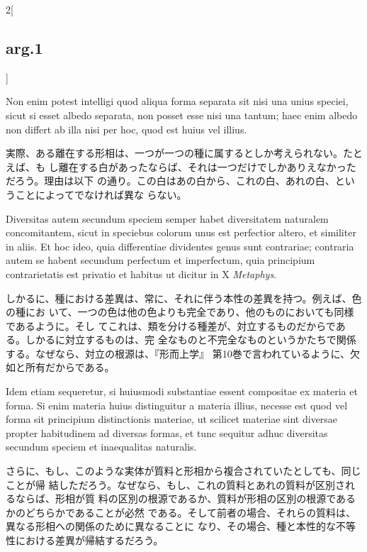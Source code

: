 \documentclass[paper=a4paper,fontsize=10pt,jafontsize=9pt,titlepage]{jlreq}
\begin{document}
\begin{paracol}{2}[\subsection{arg.1}]
\switchcolumn*

Non enim potest intelligi quod aliqua forma separata sit nisi una
unius speciei, sicut si esset albedo separata, non posset esse nisi
una tantum; haec enim albedo non differt ab illa nisi per hoc, quod
est huius vel illius.

\switchcolumn

実際、ある離在する形相は、一つが一つの種に属するとしか考えられない。たとえば、も
し離在する白があったならば、それは一つだけでしかありえなかっただろう。理由は以下
の通り。この白はあの白から、これの白、あれの白、ということによってでなければ異な
らない。
 
\switchcolumn*

Diversitas autem secundum speciem semper habet diversitatem naturalem
concomitantem, sicut in speciebus colorum unus est perfectior altero,
et similiter in aliis. Et hoc ideo, quia differentiae dividentes genus
sunt contrariae; contraria autem se habent secundum perfectum et
imperfectum, quia principium contrarietatis est privatio et habitus ut
dicitur in X {\itshape Metaphys}.

\switchcolumn

しかるに、種における差異は、常に、それに伴う本性の差異を持つ。例えば、色の種にお
いて、一つの色は他の色よりも完全であり、他のものにおいても同様であるように。そし
てこれは、類を分ける種差が、対立するものだからである。しかるに対立するものは、完
全なものと不完全なものというかたちで関係する。なぜなら、対立の根源は、『形而上学』
第10巻で言われているように、欠如と所有だからである。
 
\switchcolumn*

Idem etiam sequeretur, si huiusmodi substantiae essent compositae ex
materia et forma. Si enim materia huius distinguitur a materia illius,
necesse est quod vel forma sit principium distinctionis materiae, ut
scilicet materiae sint diversae propter habitudinem ad diversas
formas, et tunc sequitur adhuc diversitas secundum speciem et
inaequalitas naturalis.

\switchcolumn

さらに、もし、このような実体が質料と形相から複合されていたとしても、同じことが帰
結しただろう。なぜなら、もし、これの質料とあれの質料が区別されるならば、形相が質
料の区別の根源であるか、質料が形相の区別の根源であるかのどちらかであることが必然
である。そして前者の場合、それらの質料は、異なる形相への関係のために異なることに
なり、その場合、種と本性的な不等性における差異が帰結するだろう。
 
\switchcolumn*



\end{paracol}
\end{document}
